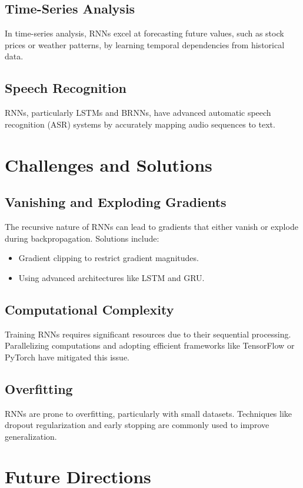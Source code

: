 \documentclass[12pt]{article}
\begin{document}
\subsection{Time-Series Analysis}
In time-series analysis, RNNs excel at forecasting future values, such as stock prices or weather patterns, by learning temporal dependencies from historical data.

\subsection{Speech Recognition}
RNNs, particularly LSTMs and BRNNs, have advanced automatic speech recognition (ASR) systems by accurately mapping audio sequences to text.

\section{Challenges and Solutions}
\subsection{Vanishing and Exploding Gradients}
The recursive nature of RNNs can lead to gradients that either vanish or explode during backpropagation. Solutions include:
\begin{itemize}
    \item Gradient clipping to restrict gradient magnitudes.
    \item Using advanced architectures like LSTM and GRU.
\end{itemize}

\subsection{Computational Complexity}
Training RNNs requires significant resources due to their sequential processing. Parallelizing computations and adopting efficient frameworks like TensorFlow or PyTorch have mitigated this issue.

\subsection{Overfitting}
RNNs are prone to overfitting, particularly with small datasets. Techniques like dropout regularization and early stopping are commonly used to improve generalization.

\section{Future Directions}
\end{document}
